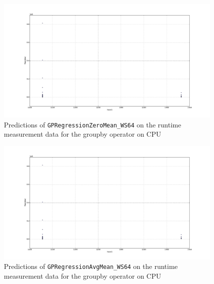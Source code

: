 \begin{figure}[htbp]
  \centering
    \includegraphics[width=\linewidth]{./Figures/gpreg_zeromean_ws64_ocl_groupby_on_device_on_cpu.pdf}
  \caption{Predictions of \texttt{GPRegressionZeroMean\_WS64} on the runtime measurement data for the groupby operator on CPU}
  \label{gpreg_zeromean_ws64_ocl_groupby_on_device_on_cpu}
\end{figure}

\begin{figure}[htbp]
  \centering
    \includegraphics[width=\linewidth]{./Figures/gpreg_avgmean_ws64_ocl_groupby_on_device_on_cpu.pdf}
  \caption{Predictions of \texttt{GPRegressionAvgMean\_WS64} on the runtime measurement data for the groupby operator on CPU}
  \label{gpreg_avgmean_ws64_ocl_groupby_on_device_on_cpu}
\end{figure}

